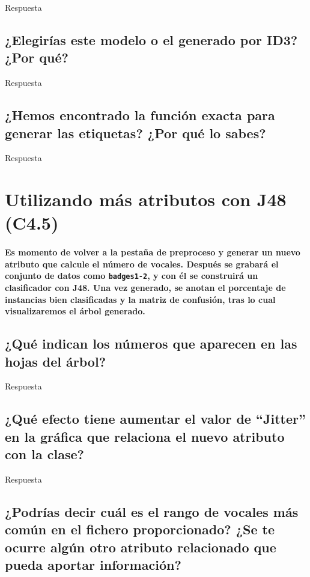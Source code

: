 \documentclass[12pt]{article}
\begin{document}
Respuesta

\subsection{\small ¿Elegirías este modelo o el generado por ID3? ¿Por qué?}

Respuesta

\subsection{\small ¿Hemos encontrado la función exacta para generar las
etiquetas? ¿Por qué lo sabes?}

Respuesta

\newpage

\section{Utilizando más atributos con J48 (C4.5)}

\paragraph{\small Es momento de volver a la pestaña de preproceso y generar un
nuevo atributo que calcule el número de vocales. Después se grabará el conjunto
de datos como \texttt{badges1-2}, y con él se construirá un clasificador
con J48. Una vez generado, se anotan el porcentaje de instancias bien
clasificadas y la matriz de confusión, tras lo cual visualizaremos el árbol
generado.}

\subsection{\small ¿Qué indican los números que aparecen en las hojas del
árbol?}

Respuesta

\subsection{\small ¿Qué efecto tiene aumentar el valor de ``Jitter'' en la
gráfica que relaciona el nuevo atributo con la clase?}

Respuesta

\subsection{\small ¿Podrías decir cuál es el rango de vocales más común en el
fichero proporcionado? ¿Se te ocurre algún otro atributo relacionado que pueda
aportar información?}
\end{document}

